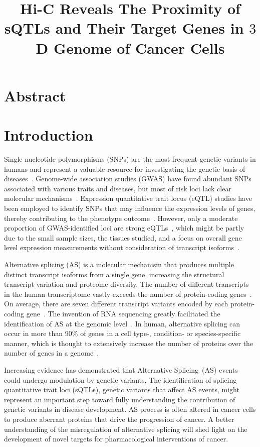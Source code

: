\documentclass[11pt]{article}
\title{\vspace{-4cm} Hi-C Reveals The Proximity of sQTLs and Their Target Genes in $3$D Genome of Cancer Cells}
\author{} %
\date{}
\begin{document}
\maketitle

\section{Abstract}


\section{Introduction}

Single nucleotide polymorphisms (SNPs) are the most frequent genetic variants in humans and represent a valuable
resource for investigating the genetic basis of diseases~\cite{shastry2009}. Genome-wide association studies (GWAS) have found
abundant SNPs associated with various traits and diseases, but most of
risk loci lack clear molecular mechanisms~\cite{buniello2018, chang2018}.
Expression quantitative trait locus (eQTL) studies have been employed to identify SNPs that may influence the expression
levels of genes, thereby contributing to the phenotype outcome~\cite{guo2018,zou2018,gong2018}. However, only a moderate proportion
of GWAS-identified loci are strong eQTLs~\cite{westra2013}, which might be partly due to the small sample sizes, the tissues studied,
and a focus on overall gene level expression measurements without consideration of transcript isoforms~\cite{zhang2015}.

Alternative splicing (AS) is a molecular mechanism that produces multiple distinct transcript isoforms from a single gene, increasing
the structural transcript variation and proteome diversity. The number of different transcripts in the human transcriptome vastly
exceeds the number of protein-coding genes~\cite{djebali2012}. On average, there are seven different transcript variants encoded by each
protein-coding gene~\cite{harrow2012}. The invention of RNA sequencing
greatly facilitated the identification of AS at the genomic level~\cite{hyung2017}. In human, alternative
splicing can occur in more than $90\%$ of genes in a cell type-, condition- or species-specific manner, which is thought to extensively increase the
number of proteins over the number of genes in a genome~\cite{wang2008, barbosa2012}.

Increasing evidence has demonstrated that Alternative Splicing~(AS) events could undergo modulation by genetic variants. The
identification of splicing quantitative trait loci (sQTLs), genetic variants that affect AS events, might represent an important step
toward fully understanding the contribution of genetic variants in disease development. AS process is often altered in cancer cells to
produce aberrant proteins that drive the progression of cancer. A better understanding of the misregulation of alternative splicing will
shed light on the development of novel targets for pharmacological interventions of cancer.
\end{document}
